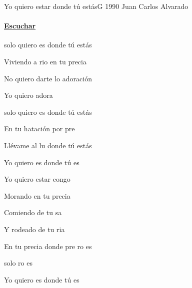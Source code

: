 \documentclass[12pt, spanish]{book}
\newcommand{\NotCCLIed}{\relax}
\begin{document}
    \begin{song}{Yo quiero estar donde tú estás}{G}
        {1990} %
        {Juan Carlos Alvarado}
        {} %
        {} %
        \ifChordBk
        \paragraph{\mbox{}\hfill\protect\href{https://open.spotify.com/intl-es/track/4yHpEcaH1WLJ2e6MlMXZXd}{Escuchar}\mbox{}\hfill}
        \fi


        \begin{SBOpGroup}
             solo quiero es donde tú estás

            Viviendo a rio en tu precia

            No quiero darte lo adoración

            Yo quiero  adora
        \end{SBOpGroup}
        \vskip 20pt
        \begin{SBOpGroup}
             solo quiero es donde tú estás

            En tu hatación por pre

            Llévame al lu donde tú estás

            Yo quiero es donde tú es
        \end{SBOpGroup}

        \begin{SBChorus}
            Yo quiero estar congo

            Morando en tu precia

            Comiendo de tu sa

            Y rodeado de tu ria

            En tu precia  donde pre ro es

             solo ro es

            Yo quiero es donde tú es
        \end{SBChorus}


\end{song}
\end{document}
